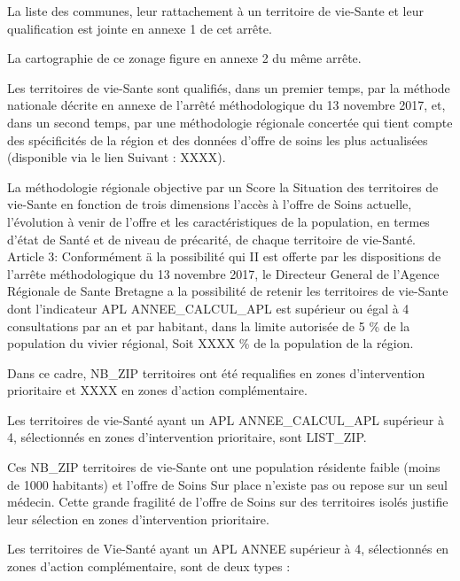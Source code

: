 \documentclass[]{article}
\begin{document}
La liste des communes, leur rattachement à un territoire de vie-Sante et
leur qualification est jointe en annexe 1 de cet arrête.

La cartographie de ce zonage figure en annexe 2 du même arrête.

Les territoires de vie-Sante sont qualifiés, dans un premier temps, par
la méthode nationale décrite en annexe de l'arrêté méthodologique du 13
novembre 2017, et, dans un second temps, par une méthodologie régionale
concertée qui tient compte des spécificités de la région et des données
d'offre de soins les plus actualisées (disponible via le lien Suivant :
XXXX).

La méthodologie régionale objective par un Score la Situation des
territoires de vie-Sante en fonction de trois dimensions l'accès à
l'offre de Soins actuelle, l'évolution à venir de l'offre et les
caractéristiques de la population, en termes d'état de Santé et de
niveau de précarité, de chaque territoire de vie-Santé. Article 3:
Conformément ä la possibilité qui II est offerte par les dispositions de
l'arrête méthodologique du 13 novembre 2017, le Directeur General de
l'Agence Régionale de Sante Bretagne a la possibilité de retenir les
territoires de vie-Sante dont l'indicateur APL ANNEE\_CALCUL\_APL est
supérieur ou égal à 4 consultations par an et par habitant, dans la
limite autorisée de 5 \% de la population du vivier régional, Soit XXXX
\% de la population de la région.

Dans ce cadre, NB\_ZIP territoires ont été requalifies en zones
d'intervention prioritaire et XXXX en zones d'action complémentaire.

Les territoires de vie-Santé ayant un APL ANNEE\_CALCUL\_APL supérieur à
4, sélectionnés en zones d'intervention prioritaire, sont LIST\_ZIP.

Ces NB\_ZIP territoires de vie-Sante ont une population résidente faible
(moins de 1000 habitants) et l'offre de Soins Sur place n'existe pas ou
repose sur un seul médecin. Cette grande fragilité de l'offre de Soins
sur des territoires isolés justifie leur sélection en zones
d'intervention prioritaire.

Les territoires de Vie-Santé ayant un APL ANNEE supérieur à 4,
sélectionnés en zones d'action complémentaire, sont de deux types :
\end{document}

